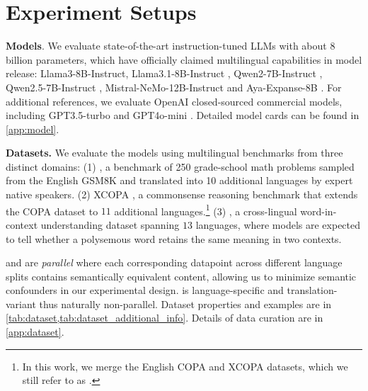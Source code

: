 \section{Experiment Setups}
\label{sec:setup}
\noindent\textbf{Models}.
We evaluate state-of-the-art instruction-tuned LLMs with about 8 billion parameters, which have officially claimed multilingual capabilities in model release: \textsf{Llama3-8B-Instruct}, \textsf{Llama3.1-8B-Instruct} \citep{llama3}, \textsf{Qwen2-7B-Instruct} \citep{qwen2}, \textsf{Qwen2.5-7B-Instruct} \citep{qwen2.5}, \textsf{Mistral-NeMo-12B-Instruct} \citep{mistral} and \textsf{Aya-Expanse-8B} \citep{aya-expanse}.
For additional references, we evaluate OpenAI closed-sourced commercial models, including \textsf{GPT3.5-turbo} \citep{gpt3.5} and \textsf{GPT4o-mini} \citep{gpt4o-mini}.
Detailed model cards can be found in \cref{app:model}.




\vspace{3pt}
\noindent\textbf{Datasets.}
We evaluate the models using multilingual benchmarks from three distinct domains:
(1) \mgsm \cite{mgsm}, a benchmark of 250 grade-school math problems sampled from the English GSM8K \citep{gsm8k} and translated into 10 additional languages by expert native speakers.
(2) XCOPA \cite{xcopa}, a commonsense reasoning benchmark that extends the COPA dataset \citep{copa} to $11$ additional languages.\footnote{In this work, we merge the English COPA and XCOPA datasets, which we still refer to as \xcopa.}  (3) \xlwic \cite{xlwic}, a cross-lingual word-in-context understanding dataset spanning $13$ languages, where models are expected to tell whether a polysemous word retains the same meaning in two contexts.

\mgsm and \xcopa are \textit{parallel} where each corresponding datapoint across different language splits contains semantically equivalent content, allowing us to minimize semantic confounders in our experimental design.  \xlwic is language-specific and translation-variant thus naturally non-parallel. Dataset properties and examples are in \cref{tab:dataset,tab:dataset_additional_info}. Details of data curation are in \cref{app:dataset}.


